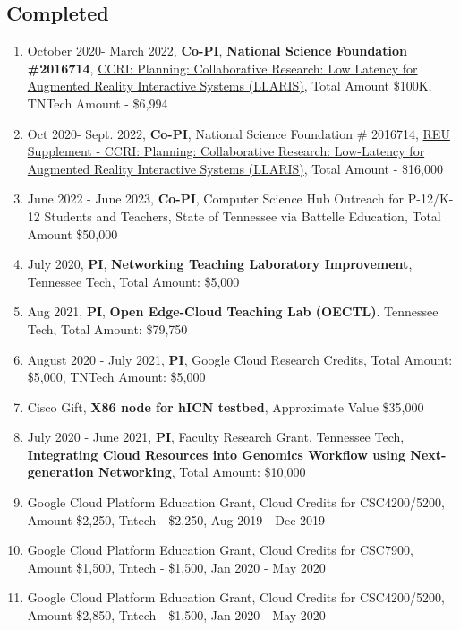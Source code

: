 
\hspace{1em}

\subsection{Completed}
\begin{enumerate}
\item October 2020- March 2022, \textbf{Co-PI}, \textbf{National Science Foundation \#2016714}, \href{https://www.nsf.gov/awardsearch/showAward?AWD_ID=2016714}{CCRI: Planning: Collaborative Research: Low Latency for Augmented Reality Interactive Systems (LLARIS)}, Total Amount \$100K, TNTech Amount - \$6,994


\item Oct 2020- Sept. 2022, \textbf{Co-PI}, National Science Foundation \# 2016714, \href{https://www.nsf.gov/awardsearch/showAward?AWD_ID=2016714}{REU Supplement -  CCRI: Planning: Collaborative Research: Low-Latency for Augmented Reality Interactive Systems (LLARIS)}, Total Amount - \$16,000

\item June 2022 - June 2023, \textbf{Co-PI}, Computer Science Hub Outreach for P-12/K-12 Students and Teachers, State of Tennessee via Battelle Education,  Total Amount \$50,000

  \item July 2020, \textbf{PI}, \textbf{Networking Teaching Laboratory Improvement}, Tennessee Tech,  Total Amount: \$5,000
  
  \item Aug 2021, \textbf{PI}, \textbf{Open Edge-Cloud Teaching Lab (OECTL)}. Tennessee Tech, Total Amount: \$79,750

\item August 2020 - July 2021, \textbf{PI}, Google Cloud Research Credits, Total Amount: \$5,000, TNTech Amount: \$5,000

\item Cisco Gift, \textbf{X86 node for hICN testbed}, Approximate Value \$35,000


  \item July 2020 - June 2021, \textbf{PI}, Faculty Research Grant, Tennessee Tech, \textbf{Integrating Cloud Resources into Genomics Workflow using Next-generation Networking}, Total Amount: \$10,000

 \item Google Cloud Platform Education Grant, Cloud Credits for CSC4200/5200, Amount \$2,250, Tntech - \$2,250, Aug 2019 - Dec 2019
 
 \item Google Cloud Platform Education Grant, Cloud Credits for CSC7900, Amount \$1,500, Tntech - \$1,500, Jan 2020 - May 2020
 
  \item Google Cloud Platform Education Grant, Cloud Credits for CSC4200/5200, Amount \$2,850, Tntech - \$1,500, Jan 2020 - May 2020
\end{enumerate}

